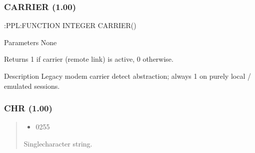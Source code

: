 \documentclass[letterpaper,10pt,english]{sphinxmanual}
\begin{document}
\subsubsection{CARRIER (1.00)}
\label{\detokenize{ppl:carrier-1-00}}
\sphinxAtStartPar
:PPL:FUNCTION INTEGER CARRIER()

\sphinxAtStartPar
Parameters
None

\sphinxAtStartPar
Returns
1 if carrier (remote link) is active, 0 otherwise.

\sphinxAtStartPar
Description
Legacy modem carrier detect abstraction; always 1 on purely local / emulated sessions.


\subsubsection{CHR (1.00)}
\label{\detokenize{ppl:chr-1-00}}
\sphinxAtStartPar
{}
\begin{quote}
\begin{description}
\begin{itemize}
\item {} 
\sphinxAtStartPar
{} \textendash{} 0\textendash{}255

\end{itemize}

\sphinxAtStartPar
Single\sphinxhyphen{}character string.

\end{description}

\sphinxAtStartPar
{}
\begin{quote}

\begin{sphinxVerbatim}[commandchars=\\\{\}]
  
\end{sphinxVerbatim}
\end{quote}
\end{quote}
\end{document}
